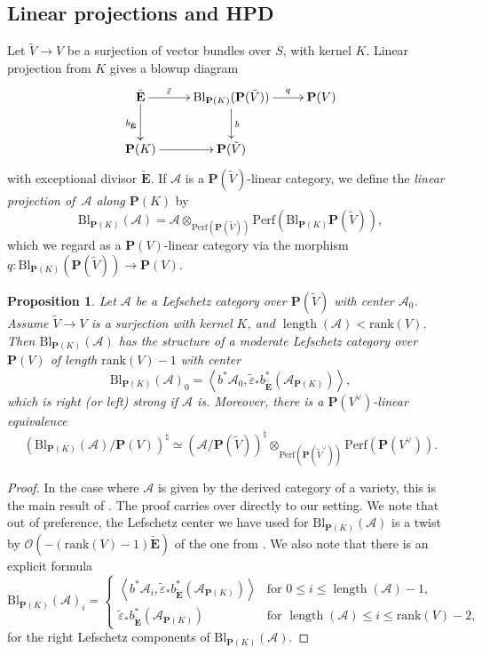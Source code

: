 \documentclass[11pt, reqno]{amsart}
\numberwithin{equation}{section}
\theoremstyle{plain}
\newtheorem{proposition}[theorem]{Proposition}
\theoremstyle{definition}
\newcommand{\Perf}{\mathrm{Perf}}
\DeclareMathOperator{\length}{\mathrm{length}}
\newcommand{\hpd}{{\natural}}
\newcommand{\svee}{\scriptscriptstyle\vee}
\newcommand{\llangle}{\left \langle}
\newcommand{\rrangle}{\right \rangle}
\newcommand{\Bl}{\mathrm{Bl}}
\newcommand{\teps}{\tilde{\eps}}
\newcommand{\eps}{\varepsilon}
\newcommand{\vV}{V^{\svee}}
\newcommand{\tV}{\tilde{V}}
\newcommand{\tbE}{\tilde{\mathbf{E}}}
\newcommand{\rank}{\mathrm{rank}}
\newcommand{\cO}{\mathcal{O}}
\newcommand{\cA}{\mathcal{A}}
\newcommand{\bP}{\mathbf{P}}
\begin{document}
\subsection{Linear projections and HPD} 

Let $\tV \to V$ be a surjection of vector bundles over $S$, with kernel $K$. 
Linear projection from $K$ gives a blowup diagram 
\begin{equation}
\label{diagram-tV-V-projection}
\vcenter{\xymatrix{
\tbE \ar[r]^-{\teps} \ar[d]_{b_{\tbE}} &
\Bl_{\bP(K)}(\bP(\tV)) \ar[d]^b \ar[r]^-{q} &
\bP(V) \\
\bP(K) \ar[r] & 
\bP(\tV)
}}
\end{equation}
with exceptional divisor $\tbE$. 
If $\cA$ is a $\bP(\tV)$-linear category, we define the \emph{linear projection of~$\cA$ along 
$\bP(K)$} by 
\begin{equation*}
\Bl_{\bP(K)}(\cA) = \cA \otimes_{\Perf(\bP(\tV))} \Perf(\Bl_{\bP(K)}\bP(\tV)), 
\end{equation*}
which we regard as a $\bP(V)$-linear category via the morphism $q \colon \Bl_{\bP(K)}(\bP(\tV)) \to \bP(V)$. 


\begin{proposition}
\label{proposition-HPD-projection-general}
Let $\cA$ be a Lefschetz category over $\bP(\tV)$ with center $\cA_0$. 
Assume $\tV \to V$ is a surjection with kernel $K$, and 
$\length(\cA) < \rank(V)$. 
Then $\Bl_{\bP(K)}(\cA)$ has the structure of a moderate 
Lefschetz category over $\bP(V)$ of length $\rank(V) - 1$ with center 
\begin{equation*}
\Bl_{\bP(K)}(\cA)_0 = \llangle 
b^* \cA_0, \teps_* b_{\tbE}^*(\cA_{\bP(K)})
\rrangle, 
\end{equation*} 
which is right \textup(or left\textup) strong if $\cA$ is. 
Moreover, there is a $\bP(\vV)$-linear equivalence 
\begin{equation*}
(\Bl_{\bP(K)}(\cA)/\bP(V))^{\hpd} \simeq (\cA/\bP(\tV))^{\hpd} \otimes_{\Perf(\bP(\tV^{\svee}))} \Perf(\bP(\vV)). 
\end{equation*}
\end{proposition}

\begin{proof}
In the case where $\cA$ is given by the derived category of a variety, this is the main result of 
\cite{carocci2015homological}. 
The proof carries over directly to our setting. 
We note that out of preference, the Lefschetz center we have used for $\Bl_{\bP(K)}(\cA)$ 
is a twist by $\cO(-(\rank(V)-1)\tbE)$ of the one from \cite{carocci2015homological}. 
We also note that there is an explicit formula
\begin{equation*}
\Bl_{\bP(K)}(\cA)_i = \begin{cases}
\llangle 
b^* \cA_{i}, \teps_* b_{\tbE}^*(\cA_{\bP(K)})
\rrangle & 
\text{for $0 \leq i \leq \length(\cA) - 1$} , \\ 
\teps_* b_{\tbE}^*(\cA_{\bP(K)}) & 
\text{for $\length(\cA) \leq i \leq \rank(V) - 2$}, 
\end{cases}
\end{equation*} 
for the right Lefschetz components of $\Bl_{\bP(K)}(\cA)$. 
\end{proof} 
\end{document}
